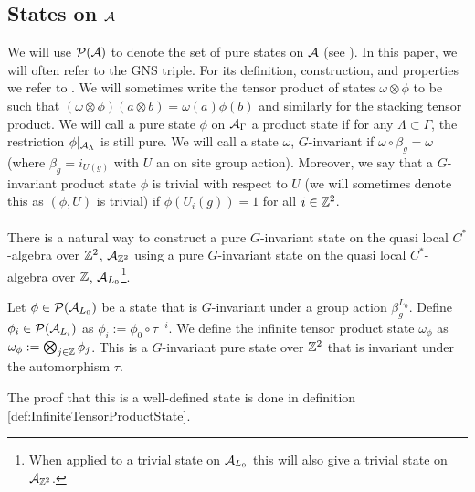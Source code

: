 \documentclass[11pt,a4paper,twoside]{article}
\numberwithin{equation}{section}
\begin{document}
	\subsection{States on \texorpdfstring{$\AA$}{}}\label{sec:States}
	We will use $\PP(\AA)$ to denote the set of pure states on $\AA$ (see \cite{bratteli1979operator}). In this paper, we will often refer to the GNS triple. For its definition, construction, and properties we refer to \cite{bratteli1979operator}. We will sometimes write the tensor product of states $\omega\otimes\phi$ to be such that $(\omega\otimes\phi)(a\otimes b)=\omega(a)\phi(b)$ and similarly for the stacking tensor product. We will call a pure state $\phi$ on $\AA_\Gamma$ a product state if for any $\Lambda\subset\Gamma$, the restriction $\phi|_{\AA_\Lambda}$ is still pure. We will call a state $\omega$, $G$-invariant if $\omega\circ\beta_g=\omega$ (where $\beta_g=i_{U(g)}$ with $U$ an on site group action). Moreover, we say that a $G$-invariant product state $\phi$ is trivial with respect to $U$ (we will sometimes denote this as $(\phi,U)$ is trivial) if $\phi(U_i(g))=1$ for all $i\in\ZZ^2$.\\\\
	There is a natural way to construct a pure $G$-invariant state on the quasi local $C^*$-algebra over $\ZZ^2$, $\AA_{\ZZ^2}$ using a pure $G$-invariant state on the quasi local $C^*$-algebra over $\ZZ$, $\AA_{L_0}$\footnote{When applied to a trivial state on $\AA_{L_0}$ this will also give a trivial state on $\AA_{\ZZ^2}$.}.
	\begin{definition}\label{def:InfiniteTensorProduct}
		Let $\phi\in\PP(\AA_{L_0})$ be a state that is $G$-invariant under a group action $\beta_g^{L_0}$. Define $\phi_i\in\PP(\AA_{L_i})$ as $\phi_i:=\phi_0\circ\tau^{-i}$. We define the infinite tensor product state $\omega_\phi$ as $\omega_\phi:=\bigotimes_{j\in\ZZ}\phi_j$. This is a $G$-invariant pure state over $\ZZ^2$ that is invariant under the automorphism $\tau$.
	\end{definition}
	The proof that this is a well-defined state is done in definition \ref{def:InfiniteTensorProductState}.
\end{document}

